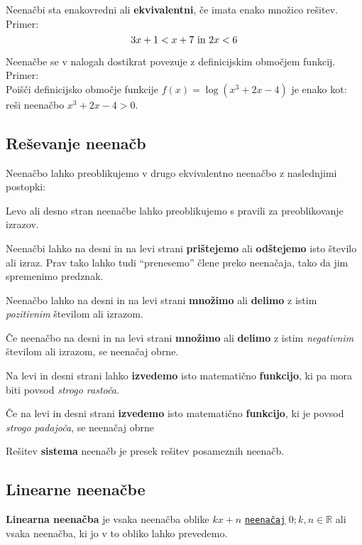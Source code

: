 \documentclass[a4paper,oneside,12pt,fleqn]{article}
\def\R{\ensuremath{\mathbb R}}
\numberwithin{equation}{section}
\newenvironment{itemize*}%
{
\vspace{-12pt}%
\begin{itemize}%
\setlength{\itemsep}{0pt}%
\setlength{\parskip}{2pt}}%
{\end{itemize}}
\begin{document}
Neenačbi sta enakovredni ali \textbf{ekvivalentni}, če imata enako množico rešitev.
Primer:
\[ 3x + 1 < x + 7 \textnormal{ in } 2x < 6 \]

Neenačbe se v nalogah dostikrat povezuje z definicijskim območjem funkcij. Primer:\\
Poišči definicijsko območje funkcije $f(x) = \log(x^3 + 2x - 4)$ je enako kot: reši
neenačbo $x^3 + 2x - 4 >0$.

\subsection{Reševanje neenačb}
\label{sec:neenac:resev}
Neenačbo lahko preoblikujemo v drugo ekvivalentno neenačbo z naslednjimi postopki:
\begin{itemize*}
  \item Levo ali desno stran neenačbe lahko preoblikujemo s pravili za preoblikovanje
    izrazov.
  \item Neenačbi lahko na desni in na levi strani \textbf{prištejemo} ali \textbf{odštejemo} isto število ali izraz.
Prav tako lahko tudi ``prenesemo'' člene preko neenačaja, tako da jim spremenimo predznak.

  \item Neenačbo lahko na desni in na levi strani \textbf{množimo} ali \textbf{delimo} z istim \textit{pozitivnim} številom
ali izrazom.

  \item Če neenačbo na desni in na levi strani \textbf{množimo} ali \textbf{delimo} z istim \textit{negativnim} številom
ali izrazom, se neenačaj obrne.

  \item Na levi in desni strani lahko \textbf{izvedemo} isto matematično \textbf{funkcijo}, ki pa mora biti povsod 
\textit{strogo rastoča}.

  \item Če na levi in desni strani \textbf{izvedemo} isto matematično \textbf{funkcijo}, ki je povsod \textit{strogo
padajoča}, se neenačaj obrne
\end{itemize*}

Rešitev \textbf{sistema} neenačb je presek rešitev posameznih neenačb.

\subsection{Linearne neenačbe}
\label{sec:neenac:lin}
\textbf{Linearna neenačba} je vsaka neenačba oblike $kx + n$
\hyperlink{point:neenacaj}{\texttt{neenačaj}} $0; k, n \in \R$ ali vsaka
neenačba, ki jo v to obliko lahko prevedemo.
\end{document}
